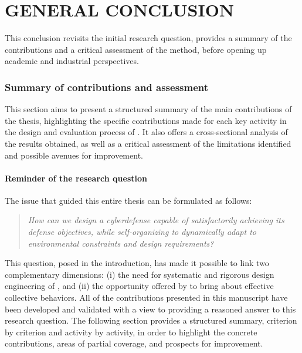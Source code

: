 \clearpage
\thispagestyle{empty}
\null
\newpage

\cleardoublepage
{}
\part*{GENERAL CONCLUSION}
\label{part:conclusion}

\clearpage
\thispagestyle{empty}
\null
\newpage


\noindent
This conclusion revisits the initial research question, provides a summary of the contributions and a critical assessment of the  method, before opening up academic and industrial perspectives.
\section*{Summary of contributions and assessment}
\label{sec:summary_assessment}
\noindent
This section aims to present a structured summary of the main contributions of the thesis, highlighting the specific contributions made for each key activity in the design and evaluation process of . It also offers a cross-sectional analysis of the results obtained, as well as a critical assessment of the limitations identified and possible avenues for improvement.
\subsection*{Reminder of the research question}
\noindent
The issue that guided this entire thesis can be formulated as follows:
\begin{quote}
  \emph{How can we design a cyberdefense  capable of satisfactorily achieving its defense objectives, while self-organizing to dynamically adapt to environmental constraints and design requirements?}
\end{quote}
\noindent
This question, posed in the introduction, has made it possible to link two complementary dimensions:
(i) the need for systematic and rigorous design engineering of , and
(ii) the opportunity offered by  to bring about effective collective behaviors.
All of the contributions presented in this manuscript have been developed and validated with a view to providing a reasoned answer to this research question. The following section provides a structured summary, criterion by criterion and activity by activity, in order to highlight the concrete contributions, areas of partial coverage, and prospects for improvement.

